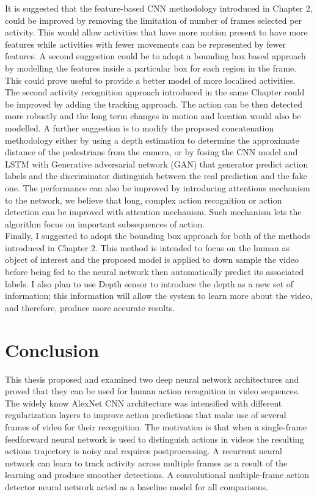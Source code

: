 It is suggested that the feature-based CNN methodology introduced in Chapter 2, could be improved by removing the limitation of number of frames selected per activity. This would allow activities that have more motion present to have more features while activities with fewer movements can be represented by fewer features. A second suggestion could be to adopt a bounding box based approach by modelling the features
inside a particular box for each region in the frame. This could prove useful to provide a better model of more localised activities.\\

The second activity recognition approach introduced in the same Chapter could be improved by adding the tracking approach. The action can be then detected more robustly and the long term changes in motion and location would also be modelled. A further suggestion is to modify the proposed concatenation methodology either by using a depth estimation to determine the approximate distance of the pedestrians from the camera, or by fusing the CNN model and LSTM with Generative adversarial network (GAN) that generator predict action labels and the discriminator distinguish between the real prediction and the fake one. The performance can also be improved by introducing attentions mechanism to the network, we believe that long, complex action recognition or action detection can be improved with attention mechanism. Such mechanism lets the algorithm focus on important subsequences of action.\\

Finally, I suggested to adopt the bounding box approach for both of the methods introduced in Chapter 2. This method is intended to focus on the human as object of interest and the proposed model is applied to down sample the video before being fed to the neural network then automatically predict its associated labels. I also plan to use Depth sensor to introduce the depth as a new set of information; this information will allow the system to learn more about the video, and therefore, produce more accurate results. 

\section{Conclusion}
This thesis proposed and examined two deep neural network architectures and proved that they can be used for human action recognition in video sequences. The widely know AlexNet CNN architecture was intensified with different regularization layers to improve action predictions that make use of several frames of video for their recognition. The motivation is that when a single-frame feedforward neural network is used to distinguish actions in videos the resulting actions trajectory is noisy and requires postprocessing. A recurrent neural network can learn to track activity across multiple frames as a result of the learning and produce smoother detections. A convolutional multiple-frame action detector neural network acted as a baseline model for all comparisons.\\

